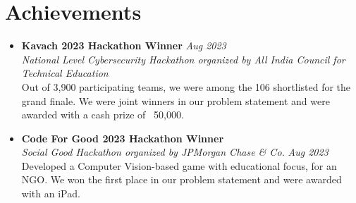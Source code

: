\section{Achievements}
\begin{itemize}
    \item \textbf{Kavach 2023 Hackathon Winner}  \hfill \textit{Aug 2023} \\ \textit{National Level Cybersecurity Hackathon organized by All India Council for Technical Education}\\
      Out of 3,900 participating teams, we were among the 106 shortlisted for the grand finale. We were joint winners in our problem statement and were awarded with a cash prize of \rupee~50,000.
    \item \textbf{Code For Good 2023 Hackathon Winner}\\ \textit{Social Good Hackathon organized by JPMorgan Chase \& Co.} \hfill \textit{Aug 2023} \\  Developed a Computer Vision-based game with educational focus, for an NGO. We won the first place in our problem statement and were awarded with an iPad.
\end{itemize}